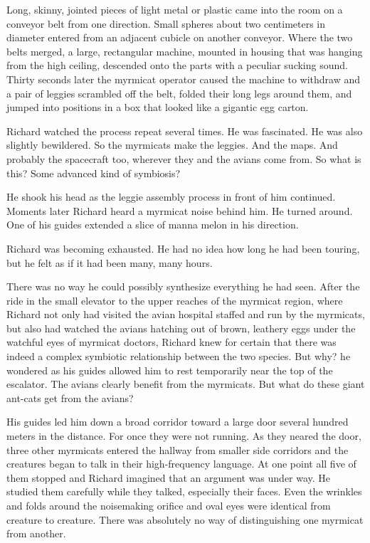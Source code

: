 \documentclass[]{article}
\begin{document}
{{Long, skinny, jointed pieces of light metal or plastic came into the room on a conveyor belt from one direction. Small spheres about two centimeters in diameter entered from an adjacent cubicle on another conveyor. Where the two belts merged, a large, rectangular machine, mounted in housing that was hanging from the high ceiling, descended onto the parts with a peculiar sucking sound. Thirty seconds later the myrmicat operator caused the machine to withdraw and a pair of leggies scrambled off the belt, folded their long legs around them, and jumped into positions in a box that looked like a gigantic egg carton.

Richard watched the process repeat several times. He was fascinated. He was also slightly bewildered. So the myrmicats make the leggies. And the maps. And probably the spacecraft too, wherever they and the avians come from. So what is this? Some advanced kind of symbiosis?

He shook his head as the leggie assembly process in front of him continued. Moments later Richard heard a myrmicat noise behind him. He turned around. One of his guides extended a slice of manna melon in his direction.

Richard was becoming exhausted. He had no idea how long he had been touring, but he felt as if it had been many, many hours.

There was no way he could possibly synthesize everything he had seen. After the ride in the small elevator to the upper reaches of the myrmicat region, where Richard not only had visited the avian hospital staffed and run by the myrmicats, but also had watched the avians hatching out of brown, leathery eggs under the watchful eyes of myrmicat doctors, Richard knew for certain that there was indeed a complex symbiotic relationship between the two species. But why? he wondered as his guides allowed him to rest temporarily near the top of the escalator. The avians clearly benefit from the myrmicats. But what do these giant ant-cats get from the avians?

His guides led him down a broad corridor toward a large door several hundred meters in the distance. For once they were not running. As they neared the door, three other myrmicats entered the hallway from smaller side corridors and the creatures began to talk in their high-frequency language. At one point all five of them stopped and Richard imagined that an argument was under way. He studied them carefully while they talked, especially their faces. Even the wrinkles and folds around the noisemaking orifice and oval eyes were identical from creature to creature. There was absolutely no way of distinguishing one myrmicat from another.

}}
\end{document}
